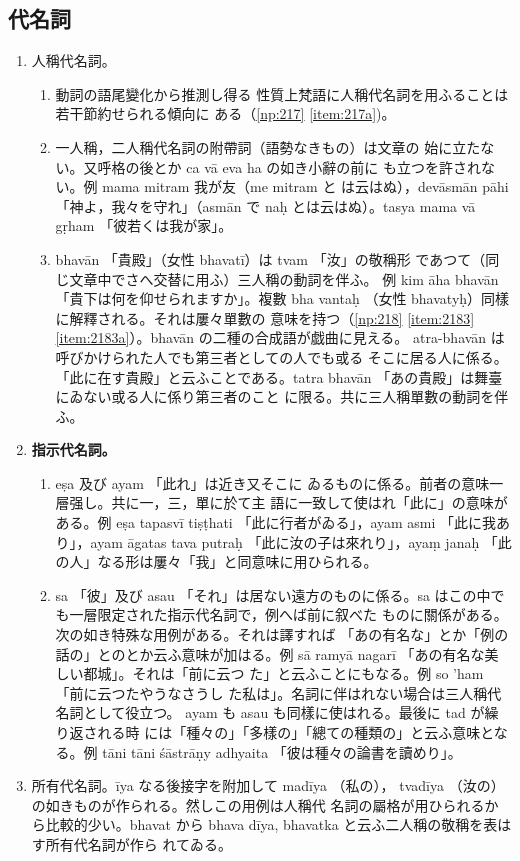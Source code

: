 \subsection{代名詞}
\numberParagraph
\begin{enumerate}[label=(\arabic*)]
\item 人稱代名詞。
\begin{enumerate}[label=(\alph*)]
\item 動詞の語尾變化から推測し得る
性質上梵語に人稱代名詞を用ふることは若干節約せられる傾向に
ある（\ref{np:217} \ref{item:217a})。
\item 一人稱，二人稱代名詞の附帶詞（語勢なきもの）は文章の
始に立たない。又呼格の後とか ca vā eva ha の如き小辭の前に
も立つを許されない。例 mama mitram 我が友（me mitram と
は云はぬ），devāsmān pāhi 「神よ，我々を守れ」（asmān で
naḥ とは云はぬ）。tasya mama vā gṛham 「彼若くは我が家」。
\item bhavān 「貴殿」（女性 bhavatī）は tvam 「汝」の敬稱形
であつて（同じ文章中でさへ交替に用ふ）三人稱の動詞を伴ふ。
例 kim āha bhavān 「貴下は何を仰せられますか」。複數 bha\-%
vantaḥ （女性 bhavatyḥ）同樣に解釋される。それは屢々單數の
意味を持つ（\ref{np:218} \ref{item:2183} \ref{item:2183a}）。bhavān の二種の合成語が戯曲に見える。
atra-bhavān は呼びかけられた人でも第三者としての人でも或る
そこに居る人に係る。「此に在す貴殿」と云ふことである。tatra\-%
bhavān 「あの貴殿」は舞臺にゐない或る人に係り第三者のこと
に限る。共に三人稱單數の動詞を伴ふ。
\end{enumerate}
\item \textbf{指示代名詞。}
\begin{enumerate}[label=(\alph*)]
\item eṣa 及び ayam 「此れ」は近き又そこに
ゐるものに係る。前者の意味一層强し。共に一，三，單に於て主
語に一致して使はれ「此に」の意味がある。例 eṣa tapasvī
tiṣṭhati 「此に行者がゐる」，ayam asmi 「此に我あり」，ayam
āgatas tava putraḥ 「此に汝の子は來れり」，ayaṃ janaḥ 「此
の人」なる形は屢々「我」と同意味に用ひられる。
\item sa 「彼」及び asau 「それ」は居ない遠方のものに係る。sa
はこの中でも一層限定された指示代名詞で，例へば前に叙べた
ものに關係がある。次の如き特殊な用例がある。それは譯すれば
「あの有名な」とか「例の話の」とのとか云ふ意味が加はる。例
sā ramyā nagarī 「あの有名な美しい都城」。それは「前に云つ
た」と云ふことにもなる。例 so 'ham 「前に云つたやうなさうし
た私は」。名詞に伴はれない場合は三人稱代名詞として役立つ。
ayam も asau も同樣に使はれる。最後に tad が繰り返される時
には「種々の」「多樣の」「總ての種類の」と云ふ意味となる。例
tāni tāni śāstrāṇy adhyaita 「彼は種々の論書を讀めり」。
\end{enumerate}
\item 所有代名詞。īya なる後接字を附加して madīya （私の），
tvadīya （汝の）の如きものが作られる。然しこの用例は人稱代
名詞の屬格が用ひられるから比較的少い。bhavat から bhava\-%
dīya, bhavatka と云ふ二人稱の敬稱を表はす所有代名詞が作ら
れてゐる。
\end{enumerate}

